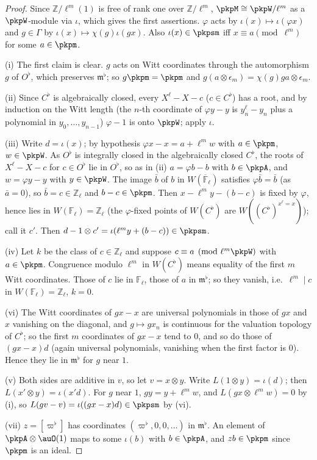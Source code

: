 \documentclass[10pt]{amsart}
\theoremstyle{definition}
\theoremstyle{remark}
\newcommand{\Z}{\mathbb Z}
\begin{document}
\begin{proof}
Since $\Z/\ell^m(1)$ is free of rank one over $\Z/\ell^m$, $\pkpM\cong\pkpW/\ell^m$ as a
$\pkpW$-module via $\iota$, which gives the first assertions. $\varphi$ acts by $\iota(x)\mapsto
\iota(\varphi x)$ and $g\in\Gamma$ by $\iota(x)\mapsto\chi(g)\iota(gx)$. Also $\iota(x)\in\pkpsm$ iff
$x\equiv a\pmod{\ell^m}$ for some $a\in\pkpm$.

(i) The first claim is clear. $g$ acts on Witt coordinates through the automorphism $g$ of $O^\flat$,
which preserves $\mathfrak m^\flat$; so $g\pkpm=\pkpm$ and $g(a\otimes\epsilon_m)=\chi(g)ga\otimes\epsilon_m$.

(ii) Since $C^\flat$ is algebraically closed, every $X^\ell-X-c$ ($c\in C^\flat$) has a root, and
by induction on the Witt length (the $n$-th coordinate of $\varphi y-y$ is $y_n^\ell-y_n$ plus a
polynomial in $y_0,\dots,y_{n-1}$) $\varphi-1$ is onto $\pkpW$; apply $\iota$.

(iii) Write $d=\iota(x)$; by hypothesis $\varphi x-x=a+\ell^mw$ with $a\in\pkpm$, $w\in\pkpW$. As
$O^\flat$ is integrally closed in the algebraically closed $C^\flat$, the roots of $X^\ell-X-c$ for
$c\in O^\flat$ lie in $O^\flat$, so as in (ii) $a=\varphi b-b$ with $b\in\pkpA$, and $w=\varphi
y-y$ with $y\in\pkpW$. The image $\bar b$ of $b$ in $W(\overline{\mathbb F}_\ell)$ satisfies
$\varphi\bar b=\bar b$ (as $\bar a=0$), so $\bar b=c\in\Z_\ell$ and $b-c\in\pkpm$. Then
$x-\ell^my-(b-c)$ is fixed by $\varphi$, hence lies in $W(\mathbb F_\ell)=\Z_\ell$ (the
$\varphi$-fixed points of $W(C^\flat)$ are $W((C^\flat)^{x^\ell=x})$); call it $c'$. Then
$d-1\otimes c'=\iota(\ell^my+(b-c))\in\pkpsm$.

(iv) Let $k$ be the class of $c\in\Z_\ell$ and suppose $c\equiv a\pmod{\ell^m\pkpW}$ with
$a\in\pkpm$. Congruence modulo $\ell^m$ in $W(C^\flat)$ means equality of the first $m$ Witt
coordinates. Those of $c$ lie in $\mathbb F_\ell$, those of $a$ in $\mathfrak m^\flat$; so they
vanish, i.e.\ $\ell^m\mid c$ in $W(\mathbb F_\ell)=\Z_\ell$, $k=0$.

(vi) The Witt coordinates of $gx-x$ are universal polynomials in those of $gx$ and $x$ vanishing on
the diagonal, and $g\mapsto gx_n$ is continuous for the valuation topology of $C^\flat$; so the
first $m$ coordinates of $gx-x$ tend to $0$, and so do those of $(gx-x)d$ (again universal
polynomials, vanishing when the first factor is $0$). Hence they lie in $\mathfrak m^\flat$ for $g$
near $1$.

(v) Both sides are additive in $v$, so let $v=x\otimes y$. Write $L(1\otimes y)=\iota(d)$; then
$L(x'\otimes y)=\iota(x'd)$. For $g$ near $1$, $gy=y+\ell^mw$, and $L(g x\otimes \ell^mw)=0$ by (i),
so $L(gv-v)=\iota((gx-x)d)\in\pkpsm$ by (vi).

(vii) $z=[\varpi^\flat]$ has coordinates $(\varpi^\flat,0,0,\dots)$ in $\mathfrak m^\flat$. An element of
$\pkpA\otimes\auO(1)$ maps to some $\iota(b)$ with $b\in\pkpA$, and $z b\in\pkpm$ since $\pkpm$ is an
ideal.
\end{proof}
\end{document}
